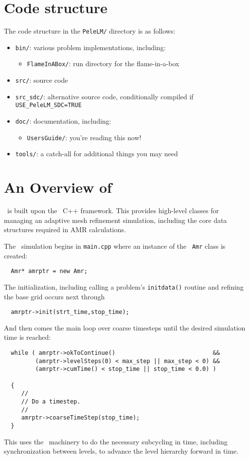 \section{Code structure}

The code structure in the {\tt PeleLM/} directory is as follows:
\begin{itemize}
\item {\tt bin/}: various problem implementations, including:
  \begin{itemize}
  \item {\tt FlameInABox/}: run directory for the flame-in-a-box
  \end{itemize}

\item {\tt src/}: source code

\item {\tt src\_sdc/}: alternative source code, conditionally compiled if {\tt USE\_PeleLM\_SDC=TRUE}

\item {\tt doc/}: documentation, including:
\begin{itemize}
 \item {\tt UsersGuide/}: you're reading this now!
\end{itemize}

\item {\tt tools/}: a catch-all for additional things you may need 
\end{itemize}


\section{An Overview of \pelelm}

\pelelm\ is built upon the \amrex\ C++ framework.  This provides
high-level classes for managing an adaptive mesh refinement simulation,
including the core data structures required in AMR calculations.

The \pelelm\ simulation begins in {\tt main.cpp} where an instance
of the \amrex\ {\tt Amr} class is created:
\begin{lstlisting}
  Amr* amrptr = new Amr;
\end{lstlisting}
The initialization, including calling a problem's {\tt initdata()}
routine and refining the base grid occurs next through
\begin{lstlisting}
  amrptr->init(strt_time,stop_time);
\end{lstlisting}
And then comes the main loop over coarse timesteps until the
desired simulation time is reached:
\begin{lstlisting}
  while ( amrptr->okToContinue()                            &&
         (amrptr->levelSteps(0) < max_step || max_step < 0) &&
         (amrptr->cumTime() < stop_time || stop_time < 0.0) )

  {
     //
     // Do a timestep.
     //
     amrptr->coarseTimeStep(stop_time);
  }
\end{lstlisting}
This uses the \amrex\ machinery to do the necessary subcycling in time,
including synchronization between levels, to advance the level hierarchy
forward in time.  

